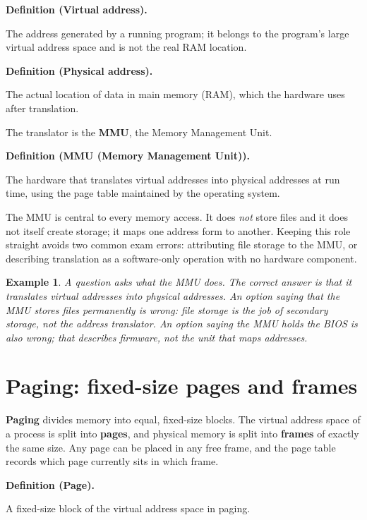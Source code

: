 \documentclass[11pt]{article}
\newtheorem{example}{Example}[section]
\newenvironment{definitionbox}[1]{%
  \par\noindent\textbf{Definition (#1).}\ \itshape
}{\par\vspace{0.3em}}
\begin{document}
\begin{definitionbox}{Virtual address}
The address generated by a running program; it belongs to the program's large
virtual address space and is not the real RAM location.
\end{definitionbox}

\begin{definitionbox}{Physical address}
The actual location of data in main memory (RAM), which the hardware uses after
translation.
\end{definitionbox}

The translator is the \textbf{MMU}, the Memory Management Unit.

\begin{definitionbox}{MMU (Memory Management Unit)}
The hardware that translates virtual addresses into physical addresses at run
time, using the page table maintained by the operating system.
\end{definitionbox}

The MMU is central to every memory access. It does \emph{not} store files and it
does not itself create storage; it maps one address form to another. Keeping
this role straight avoids two common exam errors: attributing file storage to
the MMU, or describing translation as a software-only operation with no
hardware component.

\begin{example}
A question asks what the MMU does. The correct answer is that it translates
virtual addresses into physical addresses. An option saying that the MMU stores
files permanently is wrong: file storage is the job of secondary storage, not
the address translator. An option saying the MMU holds the BIOS is also wrong;
that describes firmware, not the unit that maps addresses.
\end{example}

\section{Paging: fixed-size pages and frames}
\textbf{Paging} divides memory into equal, fixed-size blocks. The virtual
address space of a process is split into \textbf{pages}, and physical memory is
split into \textbf{frames} of exactly the same size. Any page can be placed in
any free frame, and the page table records which page currently sits in which
frame.

\begin{definitionbox}{Page}
A fixed-size block of the virtual address space in paging.
\end{definitionbox}
\end{document}
